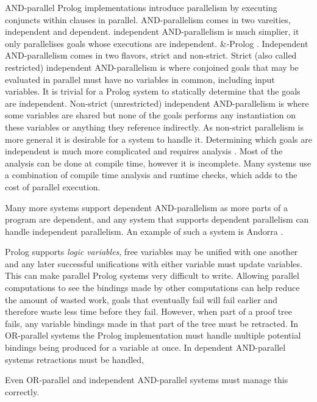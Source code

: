 AND-parallel Prolog implementations introduce parallelism by executing
conjuncts within clauses in parallel.
AND-parallelism comes in two vareities, independent and dependent.
independent AND-parallelism is much simplier, it only parallelises goals
whose executions are independent.
\&-Prolog 
\citep{Hermenegildo:1991:and-parallel,
DBLP:journals/jlp/MuthukumarBBH99}.
Independent AND-parallelism comes in two flavors, strict and non-strict.
Strict (also called restricted) independent AND-parallelism is where
conjoined goals that may be evaluated in parallel must have no variables in
common, including input variables.
It is trivial for a Prolog system to statically determine that the goals are
independent.
Non-strict (unrestricted) independent AND-parallelism is where some variables are shared
but none of the goals performs any instantiation on these variables or anything
they reference indirectly.
As non-strict parallelism is more general it is desirable for a system to
handle it.
Determining which goals are independent is much more complicated and
requires analysis 
\citep{DBLP:journals/tcs/GrasH09, Hermenegildo1995}.
Most of the analysis can be done at compile time,
however it is incomplete.
Many systems use a combination of compile time analysis and runtime checks,
which adds to the cost of parallel execution.

Many more systems support dependent AND-parallelism as more parts of a
program are dependent,
and any system that supports dependent parallelism can handle independent
parallelism.
An example of such a system is Andorra \citep{haridi:1990:andorra}.


Prolog supports \emph{logic variables},
free variables may be unified with one another and any later successful
unifications with either variable must update variables.
This can make parallel Prolog systems very difficult to write.
Allowing parallel computations to see the bindings made by other
computations can help reduce the amount of wasted work,
goals that eventually fail will fail earlier and therefore waste less time
before they fail.
However, when part of a proof tree fails, any variable bindings made in that
part of the tree must be retracted.
In OR-parallel systems the Prolog implementation must handle multiple
potential bindings being produced for a variable at once.
In dependent AND-parallel systems retractions must be handled, 


Even
OR-parallel and independent AND-parallel systems must manage this correctly.




